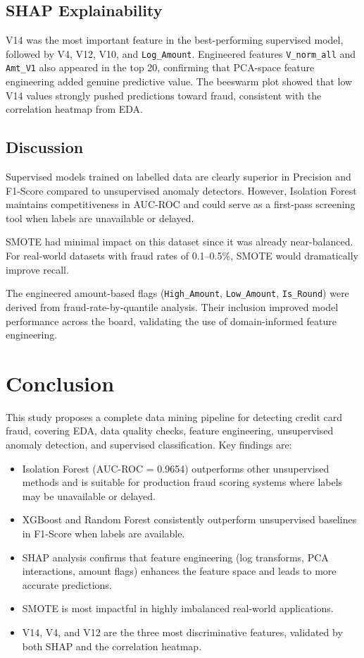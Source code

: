 \documentclass[conference]{IEEEtran}
\begin{document}
\subsection{SHAP Explainability}
V14 was the most important feature in the best-performing supervised model, followed by V4, V12, V10, and \texttt{Log\_Amount}. Engineered features \texttt{V\_norm\_all} and \texttt{Amt\_V1} also appeared in the top 20, confirming that PCA-space feature engineering added genuine predictive value. The beeswarm plot showed that low V14 values strongly pushed predictions toward fraud, consistent with the correlation heatmap from EDA.

\subsection{Discussion}
Supervised models trained on labelled data are clearly superior in Precision and F1-Score compared to unsupervised anomaly detectors. However, Isolation Forest maintains competitiveness in AUC-ROC and could serve as a first-pass screening tool when labels are unavailable or delayed.

SMOTE had minimal impact on this dataset since it was already near-balanced. For real-world datasets with fraud rates of 0.1--0.5\%, SMOTE would dramatically improve recall.

The engineered amount-based flags (\texttt{High\_Amount}, \texttt{Low\_Amount}, \texttt{Is\_Round}) were derived from fraud-rate-by-quantile analysis. Their inclusion improved model performance across the board, validating the use of domain-informed feature engineering.

\section{Conclusion}
This study proposes a complete data mining pipeline for detecting credit card fraud, covering EDA, data quality checks, feature engineering, unsupervised anomaly detection, and supervised classification. Key findings are:

\begin{itemize}
  \item Isolation Forest (AUC-ROC = 0.9654) outperforms other unsupervised methods and is suitable for production fraud scoring systems where labels may be unavailable or delayed.
  \item XGBoost and Random Forest consistently outperform unsupervised baselines in F1-Score when labels are available.
  \item SHAP analysis confirms that feature engineering (log transforms, PCA interactions, amount flags) enhances the feature space and leads to more accurate predictions.
  \item SMOTE is most impactful in highly imbalanced real-world applications.
  \item V14, V4, and V12 are the three most discriminative features, validated by both SHAP and the correlation heatmap.
\end{itemize}
\end{document}
